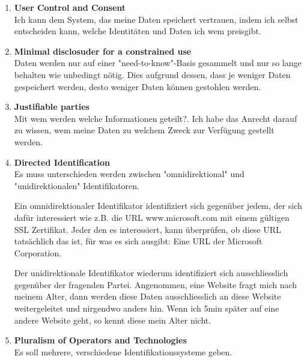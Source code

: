 \documentclass[a4paper, 11pt]{article}
\begin{document}
\begin{enumerate}
	\item \textbf{User Control and Consent} \\
			Ich kann dem System, das meine Daten speichert vertrauen, indem ich selbst entscheiden kann, welche Identitäten und Daten ich wem preisgibt.
	\item \textbf{Minimal disclosuder for a constrained use}\\
			Daten werden nur auf einer "need-to-know"-Basis gesammelt und nur so lange behalten wie unbedingt nötig. Dies aufgrund dessen, dass je weniger Daten gespeichert werden, desto weniger Daten können gestohlen werden.
	\item \textbf{Justifiable parties}\\
			Mit wem werden welche Informationen geteilt?. Ich habe das Anrecht darauf zu wissen, wem meine Daten zu welchem Zweck zur Verfügung gestellt werden.
	\item \textbf{Directed Identification}\\
			Es muss unterschieden werden zwischen "omnidirektional" und "unidirektionalen" Identifikatoren. 
			
			Ein omnidirektionaler Identifikator identifiziert sich gegenüber jedem, der sich dafür interessiert wie z.B. die URL www.microsoft.com mit einem gültigen SSL Zertifikat. Jeder den es interessiert, kann überprüfen, ob diese URL tatsächlich das ist, für was es sich ausgibt: Eine URL der Microsoft Corporation. 
			
			Der unidirektionale Identifikator wiederum identifiziert sich ausschliesslich gegenüber der fragenden Partei. Angenommen, eine Website fragt mich nach meinem Alter, dann werden diese Daten ausschliesslich an diese Website weitergeleitet und nirgendwo anders hin. Wenn ich 5min später auf eine andere Website geht, so kennt diese mein Alter nicht.
	\item \textbf{Pluralism of Operators and Technologies}\\
			Es soll mehrere, verschiedene Identifikationssysteme geben.
			

\end{enumerate}
\end{document}
